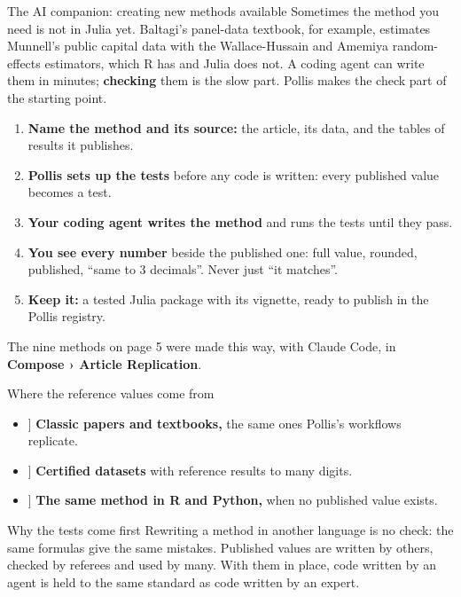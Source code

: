 \documentclass[10pt,a4paper]{article}
\newcommand{\listicon}[1]{\makebox[1.25em][c]{\color{deepamber}#1}}
\newcommand{\status}[1]{\hfill{\footnotesize\color{soft}#1}}
\begin{document}
\vspace{6mm}
\begin{pbox}{The AI companion: creating new methods \status{available}}
Sometimes the method you need is not in Julia yet. Baltagi's panel-data textbook, for example,
estimates Munnell's public capital data with the Wallace-Hussain and Amemiya random-effects
estimators, which R has and Julia does not. A coding agent can write them in minutes;
\textbf{checking} them is the slow part. Pollis makes the check part of the starting point.
\begin{enumerate}[label={\color{amber}\bfseries\arabic*}, leftmargin=5mm, itemsep=3pt, topsep=4pt]
  \item \textbf{Name the method and its source:} the article, its data, and the tables of results it publishes.
  \item \textbf{Pollis sets up the tests} before any code is written: every published value becomes a test.
  \item \textbf{Your coding agent writes the method} and runs the tests until they pass.
  \item \textbf{You see every number} beside the published one: full value, rounded, published,
    ``same to 3 decimals''. Never just ``it matches''.
  \item \textbf{Keep it:} a tested Julia package with its vignette, ready to publish in the Pollis registry.
\end{enumerate}
The nine methods on page 5 were made this way, with Claude Code, in \textbf{Compose › Article Replication}.
\end{pbox}

\vspace{4mm}
\begin{minipage}[t]{0.485\linewidth}\vspace{0pt}
\begin{pbox}[equal height group=ai1]{Where the reference values come from}
\begin{itemize}[leftmargin=1.7em]
  \item[\listicon{\faBook}] \textbf{Classic papers and textbooks,} the same ones Pollis's workflows replicate.
  \item[\listicon{\faCheckDouble}] \textbf{Certified datasets} with reference results to many digits.
  \item[\listicon{\faBalanceScale}] \textbf{The same method in R and Python,} when no published value exists.
\end{itemize}
\end{pbox}
\end{minipage}\hfill
\begin{minipage}[t]{0.485\linewidth}\vspace{0pt}
\begin{pbox}[equal height group=ai1]{Why the tests come first}
Rewriting a method in another language is no check: the same formulas give the same mistakes.
Published values are written by others, checked by referees and used by many. With them in place,
code written by an agent is held to the same standard as code written by an expert.
\end{pbox}
\end{minipage}
\end{document}
